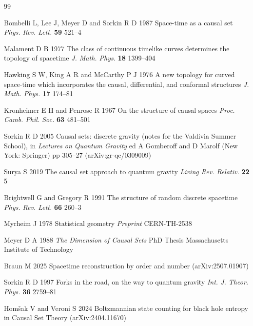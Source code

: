 \begin{thebibliography}{99}

 Bombelli L, Lee J, Meyer D and Sorkin R D 1987 Space-time as a causal set \textit{Phys. Rev. Lett.} \textbf{59} 521--4

 Malament D B 1977 The class of continuous timelike curves determines the topology of spacetime \textit{J. Math. Phys.} \textbf{18} 1399--404

 Hawking S W, King A R and McCarthy P J 1976 A new topology for curved space-time which incorporates the causal, differential, and conformal structures \textit{J. Math. Phys.} \textbf{17} 174--81

 Kronheimer E H and Penrose R 1967 On the structure of causal spaces \textit{Proc. Camb. Phil. Soc.} \textbf{63} 481--501

 Sorkin R D 2005 Causal sets: discrete gravity (notes for the Valdivia Summer School), in \textit{Lectures on Quantum Gravity} ed A Gomberoff and D Marolf (New York: Springer) pp 305--27 (arXiv:gr-qc/0309009)

 Surya S 2019 The causal set approach to quantum gravity \textit{Living Rev. Relativ.} \textbf{22} 5

 Brightwell G and Gregory R 1991 The structure of random discrete spacetime \textit{Phys. Rev. Lett.} \textbf{66} 260--3

 Myrheim J 1978 Statistical geometry \textit{Preprint} CERN-TH-2538

 Meyer D A 1988 \textit{The Dimension of Causal Sets} PhD Thesis Massachusetts Institute of Technology

 Braun M 2025 Spacetime reconstruction by order and number (arXiv:2507.01907)

 Sorkin R D 1997 Forks in the road, on the way to quantum gravity \textit{Int. J. Theor. Phys.} \textbf{36} 2759--81

 Hom\v{s}ak V and Veroni S 2024 Boltzmannian state counting for black hole entropy in Causal Set Theory (arXiv:2404.11670)


\end{thebibliography}
